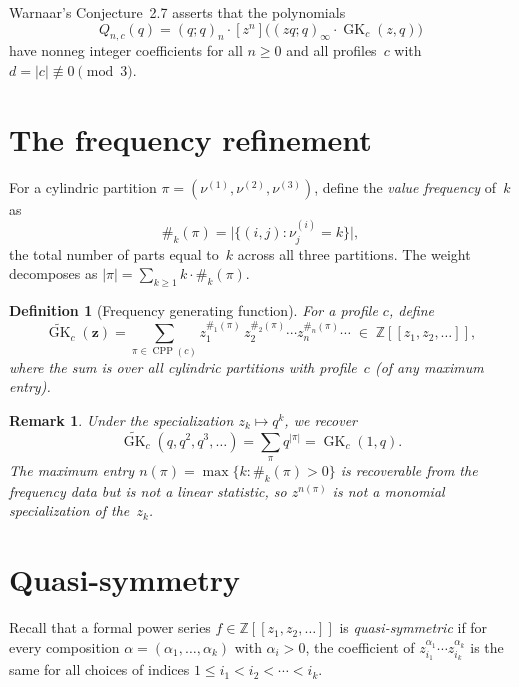 \documentclass[11pt]{article}
\newtheorem{definition}[theorem]{Definition}
\newtheorem{remark}[theorem]{Remark}
\newcommand{\Z}{\mathbb{Z}}
\newcommand{\CPP}{\operatorname{CPP}}
\newcommand{\GK}{\operatorname{GK}}
\newcommand{\qpoch}[2]{(#1;#2)_\infty}
\newcommand{\qpochn}[3]{(#1;#2)_{#3}}
\begin{document}
\medskip

Warnaar's Conjecture~2.7 asserts that the polynomials
\[
  Q_{n,c}(q)
  = \qpochn{q}{q}{n} \cdot [z^n]\bigl(\qpoch{zq}{q} \cdot \GK_c(z,q)\bigr)
\]
have nonneg integer coefficients for all $n \geq 0$ and all profiles~$c$
with $d = |c| \not\equiv 0 \pmod{3}$.

\section{The frequency refinement}
\label{sec:frequency}

For a cylindric partition $\pi = (\nu^{(1)}, \nu^{(2)}, \nu^{(3)})$,
define the \emph{value frequency} of~$k$ as
\[
  \#_k(\pi) = \bigl|\{(i,j) : \nu^{(i)}_j = k\}\bigr|,
\]
the total number of parts equal to~$k$ across all three partitions.
The weight decomposes as $|\pi| = \sum_{k \geq 1} k \cdot \#_k(\pi)$.

\begin{definition}[Frequency generating function]
For a profile $c$, define
\begin{equation}\label{eq:GKtilde}
  \widetilde{\GK}_c(\mathbf{z})
  = \sum_{\pi \in \CPP(c)}
    z_1^{\#_1(\pi)}\, z_2^{\#_2(\pi)} \cdots z_n^{\#_n(\pi)} \cdots
  \;\in\; \Z[[z_1, z_2, \ldots]],
\end{equation}
where the sum is over all cylindric partitions with profile~$c$
(of any maximum entry).
\end{definition}

\begin{remark}
Under the specialization $z_k \mapsto q^k$, we recover
\[
  \widetilde{\GK}_c(q, q^2, q^3, \ldots)
  = \sum_{\pi} q^{|\pi|}
  = \GK_c(1, q).
\]
The maximum entry $n(\pi) = \max\{k : \#_k(\pi) > 0\}$ is
recoverable from the frequency data but is not a linear
statistic, so $z^{n(\pi)}$ is not a monomial specialization
of the~$z_k$.
\end{remark}

\section{Quasi-symmetry}
\label{sec:qsym}

Recall that a formal power series $f \in \Z[[z_1, z_2, \ldots]]$ is
\emph{quasi-symmetric} if for every composition
$\alpha = (\alpha_1, \ldots, \alpha_k)$ with $\alpha_i > 0$,
the coefficient of $z_{i_1}^{\alpha_1} \cdots z_{i_k}^{\alpha_k}$
is the same for all choices of indices $1 \leq i_1 < i_2 < \cdots < i_k$.
\end{document}
